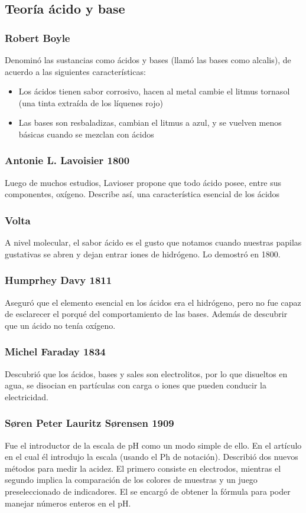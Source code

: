 \subsection{Teoría ácido y base}
\subsubsection{Robert Boyle}
Denominó las sustancias como ácidos y bases (llamó las bases como alcalis), de acuerdo a las siguientes características:
\begin{itemize}
	\item Los ácidos tienen sabor corrosivo, hacen al metal cambie el litmus tornasol (una tinta extraída de los líquenes rojo)
	\item Las bases son resbaladizas, cambian el litmus a azul, y se vuelven menos básicas cuando se mezclan con ácidos
\end{itemize}

\subsubsection{Antonie L. Lavoisier 1800}
Luego de muchos estudios, Lavioser propone que todo ácido posee, entre sus componentes, oxígeno. Describe así, una característica esencial de los ácidos

\subsubsection{Volta}
A nivel molecular, el sabor ácido es el gusto que notamos cuando nuestras papilas gustativas se abren y dejan entrar iones de hidrógeno. Lo demostró en 1800.
\subsubsection{Humprhey Davy 1811}
Aseguró que el elemento esencial en los ácidos era el hidrógeno, pero no fue capaz de esclarecer el porqué del comportamiento de las bases. Además de descubrir que un ácido no tenía oxígeno.

\subsubsection{Michel Faraday 1834}
Descubrió que los ácidos, bases y sales son electrolitos, por lo que disueltos en agua, se disocian en partículas con carga o iones que pueden conducir la electricidad.

\subsubsection{Søren Peter Lauritz Sørensen 1909}
Fue el introductor de la escala de pH como un modo simple de ello. En el artículo en el cual él introdujo la escala (usando el Ph de notación). Describió
dos nuevos métodos para medir la acidez. El primero consiste en electrodos, mientras el segundo implica la comparación de los colores de muestras y un juego preseleccionado de indicadores. El se encargó de obtener la fórmula para poder manejar números enteros en el pH.

